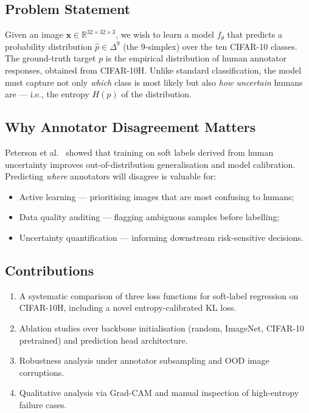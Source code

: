 \documentclass[11pt,a4paper]{article}
\begin{document}
\subsection{Problem Statement}

Given an image $\mathbf{x} \in \mathbb{R}^{32 \times 32 \times 3}$, we wish
to learn a model $f_\theta$ that predicts a probability distribution
$\hat{p} \in \Delta^9$ (the 9-simplex) over the ten CIFAR-10 classes.
The ground-truth target $p$ is the empirical distribution of human annotator
responses, obtained from CIFAR-10H.
Unlike standard classification, the model must capture not only \emph{which}
class is most likely but also \emph{how uncertain} humans are — i.e., the
entropy $H(p)$ of the distribution.

\subsection{Why Annotator Disagreement Matters}

Peterson et al.~\cite{peterson2019human} showed that training on soft labels
derived from human uncertainty improves out-of-distribution generalisation and
model calibration.
Predicting \emph{where} annotators will disagree is valuable for:
\begin{itemize}[noitemsep]
  \item Active learning — prioritising images that are most confusing to humans;
  \item Data quality auditing — flagging ambiguous samples before labelling;
  \item Uncertainty quantification — informing downstream risk-sensitive decisions.
\end{itemize}

\subsection{Contributions}

\begin{enumerate}[noitemsep]
  \item A systematic comparison of three loss functions for soft-label regression
        on CIFAR-10H, including a novel entropy-calibrated KL loss.
  \item Ablation studies over backbone initialisation (random, ImageNet,
        CIFAR-10 pretrained) and prediction head architecture.
  \item Robustness analysis under annotator subsampling and OOD image corruptions.
  \item Qualitative analysis via Grad-CAM and manual inspection of high-entropy
        failure cases.
\end{enumerate}
\end{document}
